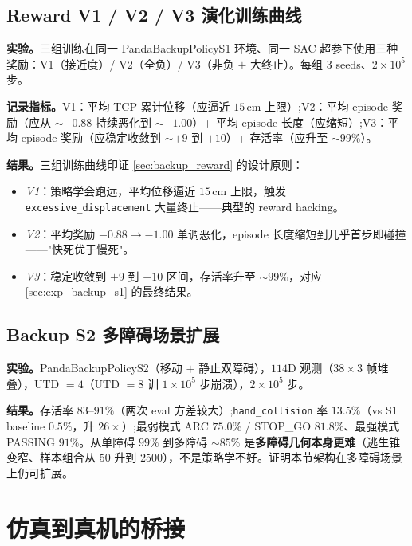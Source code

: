 \subsection{Reward V1 / V2 / V3 演化训练曲线}\label{sec:exp_reward_evolution}

\textbf{实验。}三组训练在同一 PandaBackupPolicyS1 环境、同一 SAC 超参下使用三种奖励：V1（接近度）/ V2（全负）/ V3（非负 $+$ 大终止）。每组 $3$ seeds、$2 \times 10^5$ 步。

\textbf{记录指标。}V1：平均 TCP 累计位移（应逼近 $15$\,cm 上限）;V2：平均 episode 奖励（应从 $\sim -0.88$ 持续恶化到 $\sim -1.00$）+ 平均 episode 长度（应缩短）;V3：平均 episode 奖励（应稳定收敛到 $\sim +9$ 到 $+10$）+ 存活率（应升至 $\sim 99\%$）。

\textbf{结果。}三组训练曲线印证 \cref{sec:backup_reward} 的设计原则：
\begin{itemize}
  \item \emph{V1}：策略学会跑远，平均位移逼近 $15$\,cm 上限，触发 \texttt{excessive\_displacement} 大量终止——典型的 reward hacking。
  \item \emph{V2}：平均奖励 $-0.88 \to -1.00$ 单调恶化，episode 长度缩短到几乎首步即碰撞——"快死优于慢死"。
  \item \emph{V3}：稳定收敛到 $+9$ 到 $+10$ 区间，存活率升至 $\sim 99\%$，对应\cref{sec:exp_backup_s1} 的最终结果。
\end{itemize}

\subsection{Backup S2 多障碍场景扩展}\label{sec:exp_backup_s2}

\textbf{实验。}PandaBackupPolicyS2（移动 $+$ 静止双障碍），$114$D 观测（$38 \times 3$ 帧堆叠），UTD $= 4$（UTD $= 8$ 训 $1 \times 10^5$ 步崩溃），$2 \times 10^5$ 步。

\textbf{结果。}存活率 $83$–$91\%$（两次 eval 方差较大）;\texttt{hand\_collision} 率 $13.5\%$（vs S1 baseline $0.5\%$，升 $26\times$）;最弱模式 ARC $75.0\%$ / STOP\_GO $81.8\%$、最强模式 PASSING $91\%$。从单障碍 $99\%$ 到多障碍 $\sim 85\%$ 是\textbf{多障碍几何本身更难}（逃生锥变窄、样本组合从 $50$ 升到 $2500$），不是策略学不好。证明本节架构在多障碍场景上仍可扩展。

\section{仿真到真机的桥接}\label{sec:sim_to_real_bridge}

